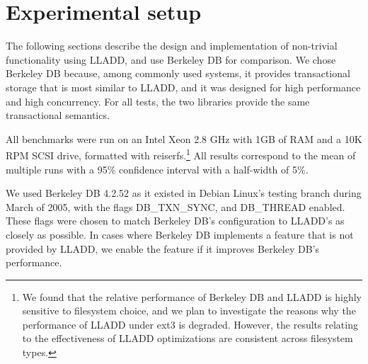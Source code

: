 \documentclass[10pt,letterpaper,twocolumn,english]{article}
\newcommand{\yad}{LLADD\xspace}
\begin{document}
%



\section{Experimental setup}
\label{sec:experimental_setup}

The following sections describe the design and implementation of
non-trivial functionality using \yad, and use Berkeley DB for
comparison.  We chose Berkeley DB because, among
commonly used systems, it provides transactional storage that is most
similar to \yad, and it was
designed for high performance and high concurrency.
For all tests, the two libraries provide the same transactional semantics.

All benchmarks were run on an Intel Xeon 2.8 GHz with 1GB of RAM and a
10K RPM SCSI drive, formatted with reiserfs.\footnote{We found that the
relative performance of Berkeley DB and \yad is highly sensitive to
filesystem choice, and we plan to investigate the reasons why the
performance of \yad under ext3 is degraded. However, the results
relating to the effectiveness of \yad optimizations are consistent across filesystem
types.}  All results correspond to the mean of multiple runs
with a 95\% confidence interval with a half-width of 5\%.

We used Berkeley DB 4.2.52 as it existed in Debian Linux's testing
branch during March of 2005, with the flags DB\_TXN\_SYNC, and DB\_THREAD
enabled. These flags were chosen to match 
Berkeley DB's configuration to \yad's as closely as possible.  In cases where
Berkeley DB implements a feature that is not provided by \yad, we
enable the feature if it improves Berkeley DB's performance.
\end{document}
